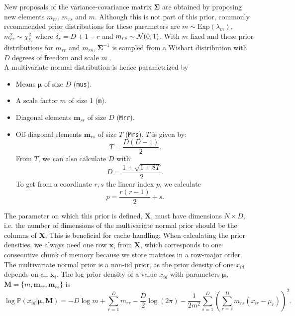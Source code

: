 \documentclass[a4paper,11pt]{article}
\def\M{\boldsymbol{M}}
\def\X{\boldsymbol{X}}
\def\x{\boldsymbol{x}}
\def\bmrr{\boldsymbol m_{rr}}
\def\bmrs{\boldsymbol m_{rs}}
\def\bmu{\boldsymbol{\mu}}
\def\bSigma{\boldsymbol{\Sigma}}
\def\p{\mathbb{P}}
\def\mrr{m_{rr}}
\newcommand{\privparam}[1]{\texttt{\textunderscore #1}}
\begin{document}
New proposals of the variance-covariance matrix $\bSigma$ are obtained by proposing new elements $m_{rr}$, $m_{rs}$ and $m$. Although this is not part of this prior, commonly recommended prior distributions for these parameters are $m \sim \text{Exp}(\lambda_m)$, $m_{rr}^2 \sim \chi_{\delta_r}^2$ where $\delta_r = D + 1 - r$ and $m_{rs} \sim {\cal N}(0,1)$. With $m$ fixed and these prior distributions for $m_{rr}$ and $m_{rs}$, $\bSigma^{-1}$ is sampled from a Wishart distribution with $D$ degrees of freedom and scale $m$ \citep{Anderson2003}.\\
A multivariate normal distribution is hence parametrized by
\begin{itemize}
 \item Means $\bmu$ of size $D$ (\privparam{mus}).
 \item A scale factor $m$ of size 1 (\privparam{m}).
 \item Diagonal elements $\bmrr$ of size $D$ (\privparam{Mrr}).
 \item Off-diagonal elements $\bmrs$ of size $T$ (\privparam{Mrs}). $T$ is given by:
    \begin{equation}\label{eq:sizeofM}
    T = \frac{D(D-1)}{2}.
    \end{equation}
    From $T$, we can also calculate $D$ with:
    \begin{equation*}
    D = \frac{1+\sqrt{1+8T}}{2}.
    \end{equation*}
    To get from a coordinate $r,s$ the linear index $p$, we calculate
    \begin{equation*}
     p = \frac{r(r-1)}{2} + s.
    \end{equation*}
\end{itemize}

The parameter on which this prior is defined, $\X$, must have dimensions $N \times D$, i.e. the number of dimensions of the multivariate normal prior should be the columns of $\X$. This is beneficial for cache handling: When calculating the prior densities, we always need one row $\x_i$ from $\X$, which corresponds to one consecutive chunk of memory because we store matrices in a row-major order.\\
The multivariate normal prior is a non-iid prior, as the prior density of one $x_{id}$ depends on all $\x_i$. The log prior density of a value $x_{id}$ with parameters $\bmu$, $\M = \{m, \bmrr, \bmrs\}$ is
\begin{equation*}
\log \p(x_{id} | \bmu, \M )= -D \log m + \sum_{r=1}^D \mrr -\frac{D}{2} \log (2\pi) -\frac{1}{2m^2}\sum_{s = 1}^{D}\left(\sum_{r = s}^{D}m_{rs} (x_{ir} - \mu_r) \right)^2.
\end{equation*}
\end{document}
